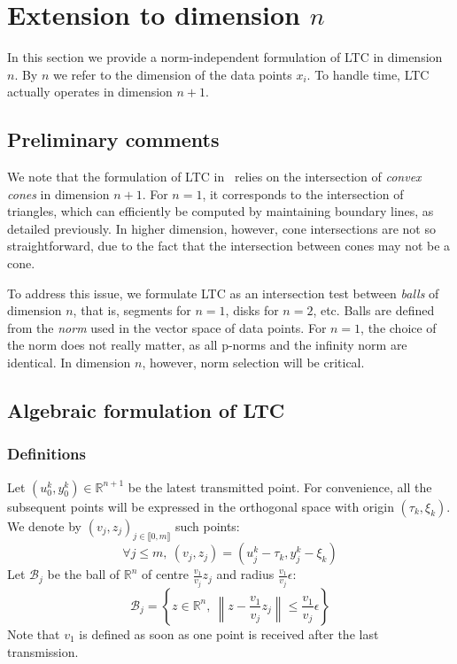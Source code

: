 \documentclass[10pt, conference, compsocconf]{IEEEtran}
\newcommand{\norm}[1]{\left\lVert#1\right\rVert}
\begin{document}
\section{Extension to dimension $n$}
\label{sec:extension}
In this section we provide a norm-independent formulation of LTC in
dimension $n$. By $n$ we refer to the dimension of the data points
$x_i$. To handle time, LTC actually operates in dimension
$n+1$.

\subsection{Preliminary comments}

We note that the formulation of LTC 
in~\cite{schoellhammer2004lightweight} relies on the intersection of 
\emph{convex cones} in dimension $n+1$. For $n=1$, it corresponds to 
the intersection of triangles, which can efficiently be computed by 
maintaining boundary lines, as detailed previously. In higher 
dimension, however, cone intersections are not so straightforward, due 
to the fact that the intersection between cones may not be a cone.

To address this issue, we formulate LTC as an intersection test between
\emph{balls} of dimension $n$, that is, segments for $n=1$, disks for
$n=2$, etc. Balls are defined from the \emph{norm} used in
the vector space of data points. For $n=1$, the choice of the norm does
not really matter, as all p-norms and the infinity norm are identical.
In dimension $n$, however, norm selection will be critical.

\subsection{Algebraic formulation of LTC}

\subsubsection{Definitions}

Let $(u_0^k, y_0^k) \in \mathbb{R}^{n+1}$ be the latest transmitted point. For convenience, all the subsequent points will be
expressed in the orthogonal space with origin $(\tau_k, \xi_k)$. We denote by $(v_j, z_j)_{j \in \llbracket 0, m \rrbracket}$ such points:
\begin{equation*}
\forall j \leq m,\  (v_j, z_j) = (u_j^k - \tau_k, y_j^k - \xi_k)
\end{equation*}
Let $\mathcal{B}_j$ be the ball of $\mathbb{R}^n$ of centre $\frac{v_1}{v_j}z_j$ and radius
$\frac{v_1}{v_j}\epsilon$:
\begin{equation*}
\mathcal{B}_j = \left\{ z \in \mathbb{R}^n,\  \norm{z-\frac{v_1}{v_j}z_j} \leq \frac{v_1}{v_j}\epsilon \right\}
\end{equation*}
Note that $v_1$ is defined as soon as one point is received after the last
transmission.
\end{document}
